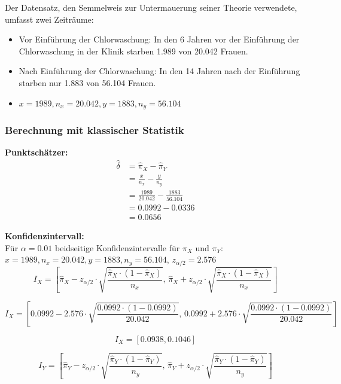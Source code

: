 \documentclass[a4paper,12pt]{article}
\begin{document}
Der Datensatz, den Semmelweis zur Untermauerung seiner Theorie verwendete, umfasst zwei Zeiträume: 
\begin{itemize}
    \item Vor Einführung der Chlorwaschung: In den 6 Jahren vor der Einführung der Chlorwaschung in der Klinik starben 1.989 von 20.042 Frauen.
    \item Nach Einführung der Chlorwaschung: In den 14 Jahren nach der Einführung starben nur 1.883 von 56.104 Frauen.
    \item $x = 1989, n_x = 20.042, y = 1883, n_y = 56.104$
\end{itemize}

\subsubsection{Berechnung mit klassischer Statistik}
\textbf{Punktschätzer:} 
\begin{align}
  \hat{\delta} &= \hat{\pi}_X - \hat{\pi}_Y \\
  &= \frac{x}{n_x} - \frac{y}{n_y} \\
  &= \frac{1989}{20.042} - \frac{1883}{56.104} \\
  &= 0.0992 - 0.0336 \\
  &= 0.0656
\end{align}

\textbf{Konfidenzintervall:} \\
Für $\alpha = 0.01$ beidseitige Konfidenzintervalle für $\pi_X$ und $\pi_Y$: \\
$x = 1989, n_x = 20.042, y = 1883, n_y = 56.104$, $z_{\alpha/2} = 2.576$ \\

\begin{equation}
  I_X = \left[\hat{\pi}_X - z_{\alpha/2} \cdot \sqrt{\frac{\hat{\pi}_X \cdot (1-\hat{\pi}_X)}{n_x}}, \, 
  \hat{\pi}_X + z_{\alpha/2} \cdot \sqrt{\frac{\hat{\pi}_X \cdot (1-\hat{\pi}_X)}{n_x}}\right]
\end{equation}

\begin{equation}
  I_X = \left[0.0992 - 2.576 \cdot \sqrt{\frac{0.0992 \cdot (1-0.0992)}{20.042}}, \, 
  0.0992 + 2.576 \cdot \sqrt{\frac{0.0992 \cdot (1-0.0992)}{20.042}}\right]
\end{equation}

\[
I_X = [0.0938, 0.1046]
\]

\begin{equation}
  I_Y = \left[\hat{\pi}_Y - z_{\alpha/2} \cdot \sqrt{\frac{\hat{\pi}_Y \cdot (1-\hat{\pi}_Y)}{n_y}}, \, 
  \hat{\pi}_Y + z_{\alpha/2} \cdot \sqrt{\frac{\hat{\pi}_Y \cdot (1-\hat{\pi}_Y)}{n_y}}\right]
\end{equation}
\end{document}
